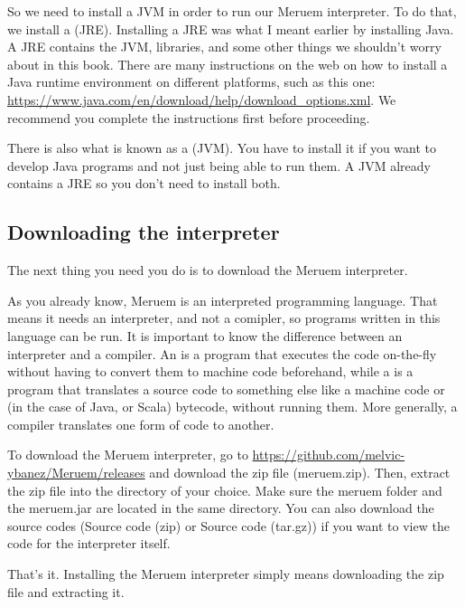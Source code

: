 So we need to install a JVM in order to run our Meruem interpreter. To do that, we install a  (JRE). Installing a JRE was what I meant earlier by installing Java. A JRE contains the JVM, libraries, and some other things we shouldn't worry about in this book. There are many instructions on the web on how to install a Java runtime environment on different platforms, such as this one: \url{ https://www.java.com/en/download/help/download_options.xml}. We recommend you complete the instructions first before proceeding.

\begin{noteparagraph}
	There is also what is known as a  (JVM). You have to 	 
	install it if you want to develop Java programs and not just being able to run them. A JVM 
	already contains a JRE so you don't need to install both.
\end{noteparagraph}

\subsection{Downloading the interpreter}
The next thing you need you do is to download the Meruem interpreter. 

As you already know, Meruem is an interpreted programming language. That means it needs an interpreter, and not a comipler, so programs written in this language can be run. It is important to know the difference between an interpreter and a compiler. An  is a program that executes the code on-the-fly without having to convert them to machine code beforehand, while a  is a program that translates a source code to something else like a machine code or (in the case of Java, or Scala) bytecode, without running them. More generally, a compiler translates one form of code to another.

To download the Meruem interpreter, go to \url{https://github.com/melvic-ybanez/Meruem/releases} and download the zip file (meruem.zip). Then, extract the zip file into the directory of your choice. Make sure the meruem folder and the meruem.jar are located in the same directory. You can also download the source codes (Source code (zip) or Source code (tar.gz)) if you want to view the code for the interpreter itself. 

That's it. Installing the Meruem interpreter simply means downloading the zip file and extracting it. 

